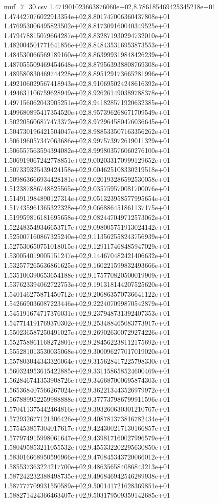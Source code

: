 \begin{filecontents*}{muf_7_30.csv}
1.471901023663876060e+02,8.786185469425345218e+01
1.474427076022913354e+02,8.801747006360437808e+01
1.476953006495823502e+02,8.817309160040349525e+01
1.479478815079664287e+02,8.832871930294732010e+01
1.482004501771641856e+02,8.848435316953873553e+01
1.484530066569189160e+02,8.863999319848426239e+01
1.487055509469454648e+02,8.879563938808769308e+01
1.489580830469744228e+02,8.895129173665281996e+01
1.492106029567418943e+02,8.910695024248616392e+01
1.494631106759628949e+02,8.926261490389788378e+01
1.497156062043905251e+02,8.941828571920632385e+01
1.499680895417354520e+02,8.957396268671709549e+01
1.502205606877473372e+02,8.972964580476036645e+01
1.504730196421504047e+02,8.988533507163356262e+01
1.506196057347063686e+02,8.997573972619011329e+01
1.506557563594394082e+02,8.999803576060276100e+01
1.506919067242778851e+02,9.002033170999129652e+01
1.507339325439424158e+02,9.004625108330219518e+01
1.509863666934428181e+02,9.020193286592530058e+01
1.512387886748825565e+02,9.035759570081700076e+01
1.514911984890127314e+02,9.051323958577995654e+01
1.517435961365322328e+02,9.066886451861137175e+01
1.519959816181695658e+02,9.082447049712573062e+01
1.522483549346653717e+02,9.098005751913024142e+01
1.525007160867325240e+02,9.113562558243756939e+01
1.527530650751018015e+02,9.129117468485947029e+01
1.530054019005151247e+02,9.144670482421406632e+01
1.532577265636861625e+02,9.160221599832493666e+01
1.535100390653654188e+02,9.175770820500019909e+01
1.537623394062722753e+02,9.191318144207525620e+01
1.540146275871450712e+02,9.206863570736641122e+01
1.542669036087223446e+02,9.222407099870542879e+01
1.545191674717376031e+02,9.237948731392407353e+01
1.547714191769370302e+02,9.253488465083773917e+01
1.550236587250491027e+02,9.269026300729274226e+01
1.552758861168272801e+02,9.284562238112175692e+01
1.555281013530035068e+02,9.300096277017019020e+01
1.557803044343326064e+02,9.315628417225798330e+01
1.560324953615422885e+02,9.331158658524600469e+01
1.562846741353908726e+02,9.346687000695874303e+01
1.565368407566267024e+02,9.362213443526979972e+01
1.567889952259988888e+02,9.377737986799911596e+01
1.570411375442464816e+02,9.393260630301210767e+01
1.572932677121306426e+02,9.408781373816782434e+01
1.575453857304017617e+02,9.424300217130166857e+01
1.577974915998061647e+02,9.439817160027996579e+01
1.580495853211055532e+02,9.455332202295630850e+01
1.583016668950596966e+02,9.470845343720066012e+01
1.585537363224217700e+02,9.486356584086843213e+01
1.587242232388498735e+02,9.496846942546289938e+01
1.587777709931550589e+02,9.500141721628369851e+01
1.588271424366463407e+02,9.503179509359142685e+01

\end{filecontents*}
